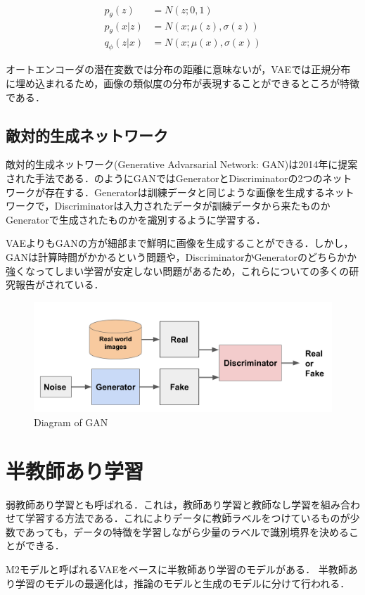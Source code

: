 \begin{align}\label{eq:vae}
p_\theta (z) & = N (z; 0, 1)  \\
p_\theta (x|z) & = N (x; \mu(z), \sigma(z)) \\
q_\phi (z|x) & = N (x; \mu(x), \sigma(x))
\end{align}

オートエンコーダの潜在変数では分布の距離に意味ないが，VAEでは正規分布に埋め込まれるため，画像の類似度の分布が表現することができるところが特徴である\cite{abbasnejad2017infinite}．

\subsection{敵対的生成ネットワーク}
敵対的生成ネットワーク(Generative Advarsarial Network: GAN)は2014年に提案された手法である\cite{GAN}．のようにGANではGeneratorとDiscriminatorの2つのネットワークが存在する．Generatorは訓練データと同じような画像を生成するネットワークで，Discriminatorは入力されたデータが訓練データから来たものかGeneratorで生成されたものかを識別するように学習する．

VAEよりもGANの方が細部まで鮮明に画像を生成することができる．しかし，GANは計算時間がかかるという問題や，DiscriminatorかGeneratorのどちらかか強くなってしまい学習が安定しない問題があるため，これらについての多くの研究報告がされている．

\begin{figure}[H]
	\centering
	\includegraphics[width=0.7\linewidth]{fig/generative_adversarial_nets.png}
	\caption{Diagram of GAN}
	\label{fig:GAN}
\end{figure}

\section{半教師あり学習}
弱教師あり学習とも呼ばれる．これは，教師あり学習と教師なし学習を組み合わせて学習する方法である．これによりデータに教師ラベルをつけているものが少数であっても，データの特徴を学習しながら少量のラベルで識別境界を決めることができる．

M2モデルと呼ばれるVAEをベースに半教師あり学習のモデルがある\cite{M2model}．
半教師あり学習のモデルの最適化は，推論のモデルと生成のモデルに分けて行われる\cite{narayanaswamy2017learning}．


